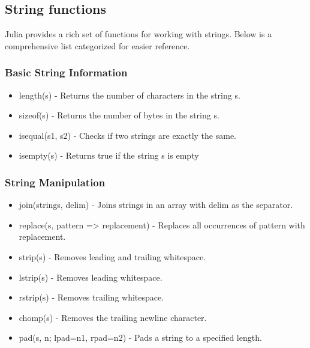 \documentclass{report}
\begin{document}
    \bigbreak \noindent 
    \subsection{String functions}
    \bigbreak \noindent 
    Julia provides a rich set of functions for working with strings. Below is a comprehensive list categorized for easier reference.
    \bigbreak \noindent 
    \subsubsection{Basic String Information}
    \begin{itemize}
        \item length(s) - Returns the number of characters in the string s.
        \item sizeof(s) - Returns the number of bytes in the string s.
        \item isequal(s1, s2) - Checks if two strings are exactly the same.
        \item isempty(s) - Returns true if the string s is empty
    \end{itemize}

    \bigbreak \noindent 
    \subsubsection{String Manipulation}
    \begin{itemize}
        \item join(strings, delim) - Joins strings in an array with delim as the separator.
        \item replace(s, pattern => replacement) - Replaces all occurrences of pattern with replacement.
        \item strip(s) - Removes leading and trailing whitespace.
        \item lstrip(s) - Removes leading whitespace.
        \item rstrip(s) - Removes trailing whitespace.
        \item chomp(s) - Removes the trailing newline character.
        \item pad(s, n; lpad=n1, rpad=n2) - Pads a string to a specified length.
    \end{itemize}

    \bigbreak \noindent 
\end{document}
